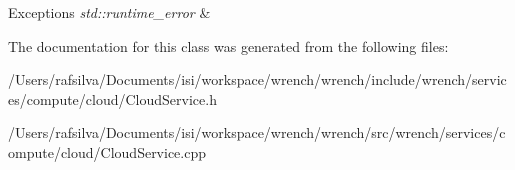 \begin{DoxyExceptions}{Exceptions}
{\em std\+::runtime\+\_\+error} & \\
\hline
\end{DoxyExceptions}


The documentation for this class was generated from the following files\+:\begin{DoxyCompactItemize}
\item 
/\+Users/rafsilva/\+Documents/isi/workspace/wrench/wrench/include/wrench/services/compute/cloud/Cloud\+Service.\+h\item 
/\+Users/rafsilva/\+Documents/isi/workspace/wrench/wrench/src/wrench/services/compute/cloud/Cloud\+Service.\+cpp\end{DoxyCompactItemize}

